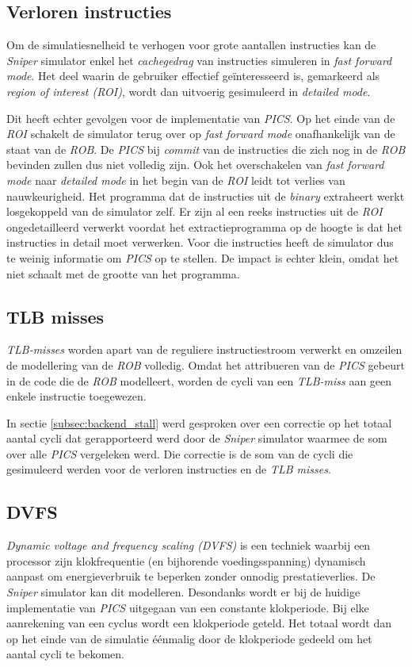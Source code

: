 \documentclass[12pt,a4paper,faculty=ea,language=nl]{ugent-doc}
\begin{document}
\subsection{Verloren instructies}
Om de simulatiesnelheid te verhogen voor grote aantallen instructies kan de \textit{Sniper} simulator enkel het \textit{cachegedrag} van instructies simuleren in \textit{fast forward mode}. Het deel waarin de gebruiker effectief geïnteresseerd is, gemarkeerd als \textit{region of interest (ROI)}, wordt dan uitvoerig gesimuleerd in \textit{detailed mode}.

Dit heeft echter gevolgen voor de implementatie van \textit{PICS}. Op het einde van de \textit{ROI} schakelt de simulator terug over op \textit{fast forward mode} onafhankelijk van de staat van de \textit{ROB}. De \textit{PICS} bij \textit{commit} van de instructies die zich nog in de \textit{ROB} bevinden zullen dus niet volledig zijn. Ook het overschakelen van \textit{fast forward mode} naar \textit{detailed mode} in het begin van de \textit{ROI} leidt tot verlies van nauwkeurigheid. Het programma dat de instructies uit de \textit{binary} extraheert werkt losgekoppeld van de simulator zelf. Er zijn al een reeks instructies uit de \textit{ROI} ongedetailleerd verwerkt voordat het extractieprogramma op de hoogte is dat het instructies in detail moet verwerken. Voor die instructies heeft de simulator dus te weinig informatie om \textit{PICS} op te stellen. De impact is echter klein, omdat het niet schaalt met de grootte van het programma.


\subsection{TLB misses}
\textit{TLB-misses} worden apart van de reguliere instructiestroom verwerkt en omzeilen de modellering van de \textit{ROB} volledig. Omdat het attribueren van de \textit{PICS} gebeurt in de code die de \textit{ROB} modelleert, worden de cycli van een \textit{TLB-miss} aan geen enkele instructie toegewezen.


In sectie \ref{subsec:backend_stall} werd gesproken over een correctie op het totaal aantal cycli dat gerapporteerd werd door de \textit{Sniper} simulator waarmee de som over alle \textit{PICS} vergeleken werd. Die correctie is de som van de cycli die gesimuleerd werden voor de verloren instructies en de \textit{TLB misses}.

\subsection{DVFS}
\textit{Dynamic voltage and frequency scaling (DVFS)} is een techniek waarbij een processor zijn klokfrequentie (en bijhorende voedingsspanning) dynamisch aanpast om energieverbruik te beperken zonder onnodig prestatieverlies. De \textit{Sniper} simulator kan dit modelleren. Desondanks wordt er bij de huidige implementatie van \textit{PICS} uitgegaan van een constante klokperiode. Bij elke aanrekening van een cyclus wordt een klokperiode geteld. Het totaal wordt dan op het einde van de simulatie éénmalig door de klokperiode gedeeld om het aantal cycli te bekomen.
\end{document}
